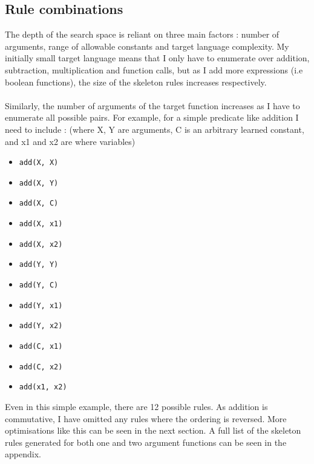 \subsection{Rule combinations}
The depth of the search space is reliant on three main factors : number of arguments, range of allowable constants and target language complexity. My initially small target language means that I only have to enumerate over addition, subtraction, multiplication and function calls, but as I add more expressions (i.e boolean functions), the size of the skeleton rules increases respectively. \\ \\
Similarly, the number of arguments of the target function increases as I have to enumerate all possible pairs. For example, for a simple predicate like addition I need to include : (where X, Y are arguments, C is an arbitrary learned constant, and x1 and x2 are where variables) 

\begin{multicols}{2}
\begin{itemize}
\item \lstinline{add(X, X)}
\item \lstinline{add(X, Y)}
\item \lstinline{add(X, C)}
\item \lstinline{add(X, x1)}
\item \lstinline{add(X, x2)}
\item \lstinline{add(Y, Y)}
\item \lstinline{add(Y, C)}
\item \lstinline{add(Y, x1)}
\item \lstinline{add(Y, x2)}
\item \lstinline{add(C, x1)}
\item \lstinline{add(C, x2)}
\item \lstinline{add(x1, x2)}
\end{itemize}
\end{multicols}

Even in this simple example, there are 12 possible rules. As addition is commutative, I have omitted any rules where the ordering is reversed. More optimisations like this can be seen in the next section.
A full list of the skeleton rules generated for both one and two argument functions can be seen in the appendix.

